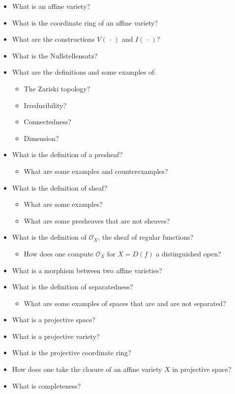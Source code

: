 \begin{itemize}
\tightlist
\item
  What is an affine variety?
\item
  What is the coordinate ring of an affine variety?
\item
  What are the constructions \(V({\,\cdot\,})\) and \(I({\,\cdot\,})\)?
\item
  What is the Nullstellensatz?
\item
  What are the definitions and some examples of:

  \begin{itemize}
  \tightlist
  \item
    The Zariski topology?
  \item
    Irreducibility?
  \item
    Connectedness?
  \item
    Dimension?
  \end{itemize}
\item
  What is the definition of a presheaf?

  \begin{itemize}
  \tightlist
  \item
    What are some examples and counterexamples?
  \end{itemize}
\item
  What is the definition of sheaf?

  \begin{itemize}
  \tightlist
  \item
    What are some examples?
  \item
    What are some presheaves that are not sheaves?
  \end{itemize}
\item
  What is the definition of \({\mathcal{O}}_X\), the sheaf of regular
  functions?

  \begin{itemize}
  \tightlist
  \item
    How does one compute \({\mathcal{O}}_X\) for \(X = D(f)\) a
    distinguished open?
  \end{itemize}
\item
  What is a morphism between two affine varieties?
\item
  What is the definition of separatedness?

  \begin{itemize}
  \tightlist
  \item
    What are some examples of spaces that are and are not separated?
  \end{itemize}
\item
  What is a projective space?
\item
  What is a projective variety?
\item
  What is the projective coordinate ring?
\item
  How does one take the closure of an affine variety \(X\) in projective
  space?
\item
  What is completeness?


\end{itemize}

